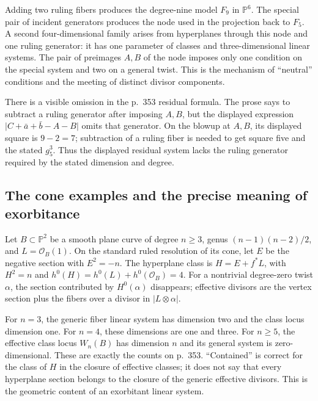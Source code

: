 Adding two ruling fibers produces the degree-nine model \(F_9\) in \(\mathbb P^6\). The special pair of incident generators produces the node used in the projection back to \(F_5\). A second four-dimensional family arises from hyperplanes through this node and one ruling generator: it has one parameter of classes and three-dimensional linear systems. The pair of preimages \(A,B\) of the node imposes only one condition on the special system and two on a general twist. This is the mechanism of ``neutral'' conditions and the meeting of distinct divisor components.

There is a visible omission in the p.~353 residual formula. The prose says to subtract a ruling generator after imposing \(A,B\), but the displayed expression \(\vert C+\bar a+\bar b-A-B\vert \) omits that generator. On the blowup at \(A,B\), its displayed square is \(9-2=7\); subtraction of a ruling fiber is needed to get square five and the stated \(g^3_5\). Thus the displayed residual system lacks the ruling generator required by the stated dimension and degree.

\subsection{The cone examples and the precise meaning of exorbitance}\label{cp2-ix-7-5}

Let \(B\subset\mathbb P^2\) be a smooth plane curve of degree \(n\geq3\), genus \((n-1)(n-2)/2\), and \(L=\mathcal O_B(1)\). On the standard ruled resolution of its cone, let \(E\) be the negative section with \(E^2=-n\). The hyperplane class is \(H=E+f^*L\), with \(H^2=n\) and \(h^0(H)=h^0(L)+h^0(\mathcal O_B)=4\). For a nontrivial degree-zero twist \(\alpha\), the section contributed by \(H^0(\alpha)\) disappears; effective divisors are the vertex section plus the fibers over a divisor in \(\vert L\otimes\alpha\vert \).

For \(n=3\), the generic fiber linear system has dimension two and the class locus dimension one. For \(n=4\), these dimensions are one and three. For \(n\geq5\), the effective class locus \(W_n(B)\) has dimension \(n\) and its general system is zero-dimensional. These are exactly the counts on p.~353. ``Contained'' is correct for the class of \(H\) in the closure of effective classes; it does not say that every hyperplane section belongs to the closure of the generic effective divisors. This is the geometric content of an exorbitant linear system.



